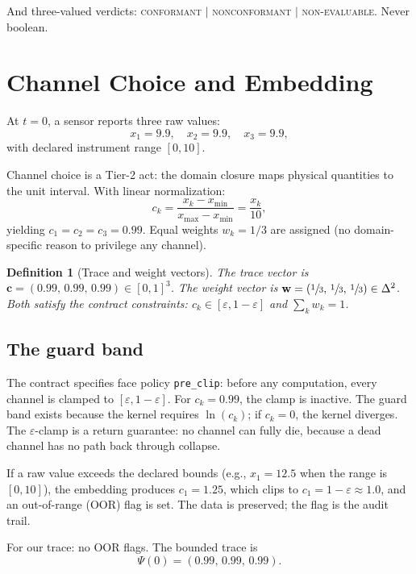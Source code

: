 \documentclass[
  aps,
  prd,
  twocolumn,
  superscriptaddress,
  nofootinbib,
  floatfix
]{revtex4-2}
\newtheorem{definition}[theorem]{Definition}
\newcommand{\eps}{\varepsilon}
\newcommand{\beq}{\begin{equation}}
\newcommand{\eeq}{\end{equation}}
\newcommand{\regime}[1]{\textrm{\upshape\scshape#1}}
\newcommand{\conform}{\regime{conformant}}
\newcommand{\nonconform}{\regime{nonconformant}}
\newcommand{\neval}{\regime{non-evaluable}}
\newcommand{\tvec}{\mathbf{c}}
\newcommand{\wvec}{\mathbf{w}}
\begin{document}
And three-valued verdicts:  \conform{} $|$ \nonconform{} $|$
\neval{}.  Never boolean.

\section{Channel Choice and Embedding}\label{sec:channels}

At $t = 0$, a sensor reports three raw values:
\beq\label{eq:raw}
  x_1 = 9.9, \quad x_2 = 9.9, \quad x_3 = 9.9,
\eeq
with declared instrument range $[0, 10]$.

Channel choice is a Tier-2 act: the domain closure maps physical
quantities to the unit interval.  With linear normalization:
\beq\label{eq:embed}
  c_k = \frac{x_k - x_{\min}}{x_{\max} - x_{\min}} = \frac{x_k}{10},
\eeq
yielding $c_1 = c_2 = c_3 = 0.99$.  Equal weights $w_k = 1/3$ are
assigned (no domain-specific reason to privilege any channel).

\begin{definition}[Trace and weight vectors]\label{def:trace}
The trace vector is $\tvec = (0.99,\, 0.99,\, 0.99) \in [0,1]^3$.
The weight vector is $\wvec = (\sfrac{1}{3},\, \sfrac{1}{3},\,
\sfrac{1}{3}) \in \Delta^2$.  Both satisfy the contract constraints:
$c_k \in [\eps, 1-\eps]$ and $\sum_k w_k = 1$.
\end{definition}

\subsection{The guard band}

The contract specifies face policy \texttt{pre\_clip}: before any
computation, every channel is clamped to $[\eps, 1-\eps]$.  For
$c_k = 0.99$, the clamp is inactive.  The guard band exists because
the kernel requires $\ln(c_k)$; if $c_k = 0$, the kernel diverges.
The $\eps$-clamp is a return guarantee: no channel can fully die,
because a dead channel has no path back through collapse.

If a raw value exceeds the declared bounds (e.g., $x_1 = 12.5$ when
the range is $[0, 10]$), the embedding produces $c_1 = 1.25$, which
clips to $c_1 = 1 - \eps \approx 1.0$, and an out-of-range (OOR)
flag is set.  The data is preserved; the flag is the audit trail.

For our trace: no OOR flags.  The bounded trace is
\beq
  \Psi(0) = (0.99,\, 0.99,\, 0.99).
\eeq
\end{document}
